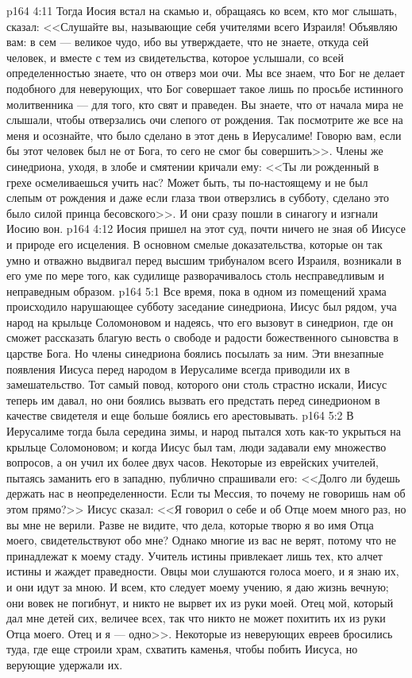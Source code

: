 \vs p164 4:11 Тогда Иосия встал на скамью и, обращаясь ко всем, кто мог слышать, сказал: <<Слушайте вы, называющие себя учителями всего Израиля! Объявляю вам: в сем --- великое чудо, ибо вы утверждаете, что не знаете, откуда сей человек, и вместе с тем из свидетельства, которое услышали, со всей определенностью знаете, что он отверз мои очи. Мы все знаем, что Бог не делает подобного для неверующих, что Бог совершает такое лишь по просьбе истинного молитвенника --- для того, кто свят и праведен. Вы знаете, что от начала мира не слышали, чтобы отверзались очи слепого от рождения. Так посмотрите же все на меня и осознайте, что было сделано в этот день в Иерусалиме! Говорю вам, если бы этот человек был не от Бога, то сего не смог бы совершить>>. Члены же синедриона, уходя, в злобе и смятении кричали ему: <<Ты ли рожденный в грехе осмеливаешься учить нас? Может быть, ты по\hyp{}настоящему и не был слепым от рождения и даже если глаза твои отверзлись в субботу, сделано это было силой принца бесовского>>. И они сразу пошли в синагогу и изгнали Иосию вон.
\vs p164 4:12 Иосия пришел на этот суд, почти ничего не зная об Иисусе и природе его исцеления. В основном смелые доказательства, которые он так умно и отважно выдвигал перед высшим трибуналом всего Израиля, возникали в его уме по мере того, как судилище разворачивалось столь несправедливым и неправедным образом.
\vs p164 5:1 Все время, пока в одном из помещений храма происходило нарушающее субботу заседание синедриона, Иисус был рядом, уча народ на крыльце Соломоновом и надеясь, что его вызовут в синедрион, где он сможет рассказать благую весть о свободе и радости божественного сыновства в царстве Бога. Но члены синедриона боялись посылать за ним. Эти внезапные появления Иисуса перед народом в Иерусалиме всегда приводили их в замешательство. Тот самый повод, которого они столь страстно искали, Иисус теперь им давал, но они боялись вызвать его предстать перед синедрионом в качестве свидетеля и еще больше боялись его арестовывать.
\vs p164 5:2 В Иерусалиме тогда была середина зимы, и народ пытался хоть как\hyp{}то укрыться на крыльце Соломоновом; и когда Иисус был там, люди задавали ему множество вопросов, а он учил их более двух часов. Некоторые из еврейских учителей, пытаясь заманить его в западню, публично спрашивали его: <<Долго ли будешь держать нас в неопределенности. Если ты Мессия, то почему не говоришь нам об этом прямо?>> Иисус сказал: <<Я говорил о себе и об Отце моем много раз, но вы мне не верили. Разве не видите, что дела, которые творю я во имя Отца моего, свидетельствуют обо мне? Однако многие из вас не верят, потому что не принадлежат к моему стаду. Учитель истины привлекает лишь тех, кто алчет истины и жаждет праведности. Овцы мои слушаются голоса моего, и я знаю их, и они идут за мною. И всем, кто следует моему учению, я даю жизнь вечную; они вовек не погибнут, и никто не вырвет их из руки моей. Отец мой, который дал мне детей сих, величее всех, так что никто не может похитить их из руки Отца моего. Отец и я --- одно>>. Некоторые из неверующих евреев бросились туда, где еще строили храм, схватить каменья, чтобы побить Иисуса, но верующие удержали их.
